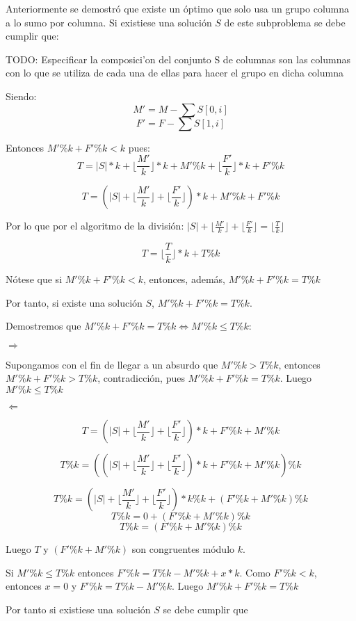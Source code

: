 \documentclass[article]{llncs}
\begin{document}
Anteriormente se demostr\'o que existe un \'optimo que solo usa un grupo columna a lo sumo 
por columna. Si existiese una solución $S$ de este subproblema se debe cumplir que:

TODO: Especificar la composici'on del conjunto S de columnas son las columnas con lo que se utiliza de cada una de ellas para hacer el grupo en dicha columna

Siendo:
$$M' = M - \sum S[0,i]$$
$$F' = F - \sum S[1, i]$$

Entonces $M' \% k + F' \% k < k$ pues: 
$$T = |S| * k + \lfloor\frac{M'}{k}\rfloor*k + M'\%k + \lfloor\frac{F'}{k}\rfloor*k + F' \% k$$

$$T = (|S| + \lfloor\frac{M'}{k}\rfloor + \lfloor\frac{F'}{k}\rfloor)*k + M'\%k + F'\%k$$

Por lo que por el algoritmo de la división: $|S| + \lfloor\frac{M'}{k}\rfloor + \lfloor\frac{F'}{k}\rfloor = \lfloor\frac{T}{k}\rfloor$

$$T = \lfloor\frac{T}{k}\rfloor*k + T \% k$$

Nótese que si $M' \% k + F' \% k < k$, entonces, además, $M' \% k + F' \% k = T \% k$

Por tanto, si existe una solución $S$, $M' \% k + F' \% k = T \% k$.

Demostremos que $M' \% k + F' \% k = T \% k \Leftrightarrow M' \% k \leq T \% k$:

$\Rightarrow$

Supongamos con el fin de llegar a un absurdo que $M' \% k > T\%k$,
entonces $M'\%k + F'\%k > T\%k$, contradicci\'on, pues 
$M' \% k + F' \% k = T \% k$. Luego $M' \% k \leq T \% k$

$\Leftarrow$

$$T = (|S| + \lfloor\frac{M'}{k}\rfloor + \lfloor\frac{F'}{k}\rfloor)*k + F'\%k + M'\% k$$

$$T\%k = ((|S| + \lfloor\frac{M'}{k}\rfloor + \lfloor\frac{F'}{k}\rfloor)*k + F'\%k + M'\% k)\%k$$

$$T\%k = (|S| + \lfloor\frac{M'}{k}\rfloor + \lfloor\frac{F'}{k}\rfloor)*k\%k + (F'\%k + M'\% k)\%k$$
$$T\%k = 0 + (F'\%k + M'\% k)\%k$$
$$T\%k = (F'\%k + M'\% k)\%k$$

Luego $T$ y $(F'\%k + M'\% k)$ son congruentes m\'odulo $k$.

Si $M' \% k \leq T \% k$ entonces $F' \%k = T\%k - M'\%k + x*k$.
Como $F' \% k < k$, entonces $x = 0$ y $F' \% k = T\%k - M'\%k$. Luego 
$M' \%k + F' \% k  = T \% k$

Por tanto si existiese una solución $S$ se debe cumplir que 
\end{document}
